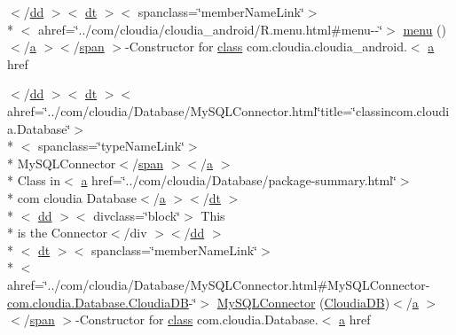 \begin{DoxyCompactItemize}
\item 
$<$/\hyperlink{stylesheet_8css_a47f4718a86835a7771ec592ece845221}{dd} $>$$<$ \hyperlink{stylesheet_8css_a107565fb4039d33b041380d6e0ea1d80}{dt} $>$$<$ spanclass=\char`\"{}member\-Name\-Link\char`\"{}$>$\\*
$<$ ahref=\char`\"{}../com/cloudia/cloudia\-\_\-android/R.\-menu.\-html\#menu-\/-\/\char`\"{}$>$ \hyperlink{index-11_8html_a130970675bc563bd79bc2a7254add303}{menu} ()$<$/\hyperlink{style_8css_a5e8981582017bb8b84c21f148345d1f7}{a} $>$$<$/\hyperlink{stylesheet_8css_a8343996ebcf16220b04e54659aac31cc}{span} $>$-\/Constructor for \hyperlink{_tools_8html_acf06f836132665ba8114f5a414c2403f}{class} com.\-cloudia.\-cloudia\-\_\-android.$<$ \hyperlink{style_8css_a5e8981582017bb8b84c21f148345d1f7}{a} href
\item 
$<$/\hyperlink{stylesheet_8css_a47f4718a86835a7771ec592ece845221}{dd} $>$$<$ \hyperlink{stylesheet_8css_a107565fb4039d33b041380d6e0ea1d80}{dt} $>$$<$ ahref=\char`\"{}../com/cloudia/Database/My\-S\-Q\-L\-Connector.\-html\char`\"{}title=\char`\"{}classincom.\-cloudia.\-Database\char`\"{}$>$\\*
$<$ spanclass=\char`\"{}type\-Name\-Link\char`\"{}$>$\\*
 My\-S\-Q\-L\-Connector$<$/\hyperlink{stylesheet_8css_a8343996ebcf16220b04e54659aac31cc}{span} $>$$<$/\hyperlink{style_8css_a5e8981582017bb8b84c21f148345d1f7}{a} $>$\\*
 Class in$<$ \hyperlink{style_8css_a5e8981582017bb8b84c21f148345d1f7}{a} href=\char`\"{}../com/cloudia/Database/package-\/summary.\-html\char`\"{}$>$\\*
 com cloudia Database$<$/\hyperlink{style_8css_a5e8981582017bb8b84c21f148345d1f7}{a} $>$$<$/\hyperlink{stylesheet_8css_a107565fb4039d33b041380d6e0ea1d80}{dt} $>$\\*
$<$ \hyperlink{stylesheet_8css_a47f4718a86835a7771ec592ece845221}{dd} $>$$<$ divclass=\char`\"{}block\char`\"{}$>$ This \\*
is the Connector$<$/div $>$$<$/\hyperlink{stylesheet_8css_a47f4718a86835a7771ec592ece845221}{dd} $>$\\*
$<$ \hyperlink{stylesheet_8css_a107565fb4039d33b041380d6e0ea1d80}{dt} $>$$<$ spanclass=\char`\"{}member\-Name\-Link\char`\"{}$>$\\*
$<$ ahref=\char`\"{}../com/cloudia/Database/My\-S\-Q\-L\-Connector.\-html\#My\-S\-Q\-L\-Connector-\/\hyperlink{index-3_8html_acb4be13b457a39ff78ddb554837f8e2a}{com.\-cloudia.\-Database.\-Cloudia\-D\-B}-\/\char`\"{}$>$ \hyperlink{index-11_8html_a322cd5a4b8e45fdf3e36cc69d22c1637}{My\-S\-Q\-L\-Connector} (\hyperlink{index-3_8html_acb4be13b457a39ff78ddb554837f8e2a}{Cloudia\-D\-B})$<$/\hyperlink{style_8css_a5e8981582017bb8b84c21f148345d1f7}{a} $>$$<$/\hyperlink{stylesheet_8css_a8343996ebcf16220b04e54659aac31cc}{span} $>$-\/Constructor for \hyperlink{_tools_8html_acf06f836132665ba8114f5a414c2403f}{class} com.\-cloudia.\-Database.$<$ \hyperlink{style_8css_a5e8981582017bb8b84c21f148345d1f7}{a} href
\end{DoxyCompactItemize}
